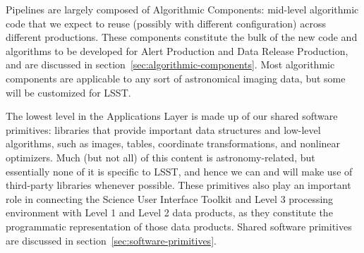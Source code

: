 Pipelines are largely composed of Algorithmic Components: mid-level algorithmic code that we expect to reuse (possibly with different configuration) across different productions.  These components constitute the bulk of the new code and algorithms to be developed for Alert Production and Data Release Production, and are discussed in section~\ref{sec:algorithmic-components}.  Most algorithmic components are applicable to any sort of astronomical imaging data, but some will be customized for LSST.

The lowest level in the Applications Layer is made up of our shared software primitives: libraries that provide important data structures and low-level algorithms, such as images, tables, coordinate transformations, and nonlinear optimizers.  Much (but not all) of this content is astronomy-related, but essentially none of it is specific to LSST, and hence we can and will make use of third-party libraries whenever possible.  These primitives also play an important role in connecting the Science User Interface Toolkit and Level 3 processing environment with Level 1 and Level 2 data products, as they constitute the programmatic representation of those data products.  Shared software primitives are discussed in section~\ref{sec:software-primitives}.


